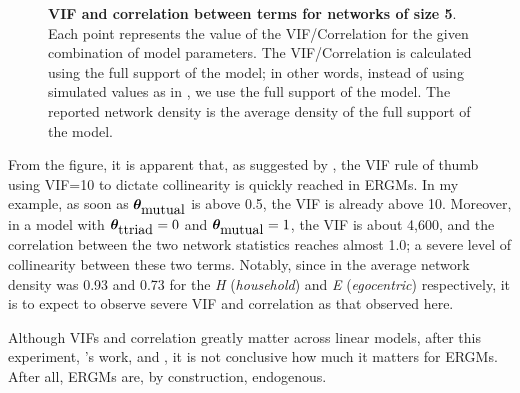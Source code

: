\documentclass[12pt]{article}
\begin{document}
\begin{figure}
\begin{minipage}
  \end{minipage}
  \caption[]{\textbf{VIF and correlation between terms for networks of size 5}. Each point represents the value of the VIF/Correlation for the given combination of model parameters. The VIF/Correlation is calculated using the full support of the model; in other words, instead of using simulated values as in \cite{duxburyDiagnosingMulticollinearityExponential2021}, we use the full support of the model. The reported network density is the average density of the full support of the model.}
  \label{fig:vif-cor}
\end{figure}

From the figure, it is apparent that, as suggested by \citeauthor{duxburyDiagnosingMulticollinearityExponential2021}, the VIF rule of thumb using VIF=10 to dictate collinearity is quickly reached in ERGMs. In my example, as soon as $\bm{\theta}_{\mbox{mutual}}$ is above 0.5, the VIF is already above 10. Moreover, in a model with $\bm{\theta}_{\mbox{ttriad}} = 0$ and $\bm{\theta}_{\mbox{mutual}} = 1$, the VIF is about 4,600, and the correlation between the two network statistics reaches almost 1.0; a severe level of collinearity between these two terms. Notably, since in \cite{krivitskyTaleTwoDatasets2022} the average network density was 0.93 and 0.73 for the \textit{H} (\textit{household}) and \textit{E} (\textit{egocentric}) respectively, it is to expect to observe severe VIF and correlation as that observed here.

Although VIFs and correlation greatly matter across linear models, after this experiment, \citeauthor*{duxburyDiagnosingMulticollinearityExponential2021}'s work, and \citeauthor*{krivitskyTaleTwoDatasets2022}, it is not conclusive how much it matters for ERGMs. After all, ERGMs are, by construction, endogenous.





 






\end{document}
